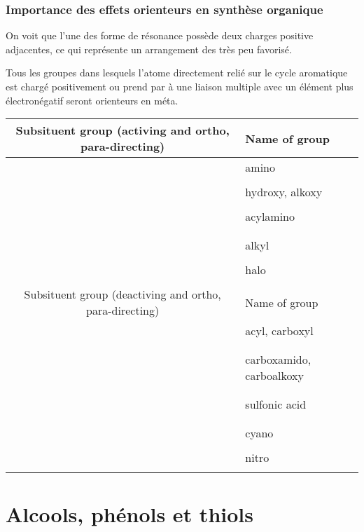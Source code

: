 \section{Importance des effets orienteurs en synthèse organique}
On voit que l'une des forme de résonance possède deux charges positive adjacentes, ce qui représente un arrangement des très peu favorisé.

Tous les groupes dans lesquels l'atome directement relié sur le cycle aromatique est chargé positivement ou prend par à une liaison multiple avec un élément plus électronégatif seront orienteurs en méta.
\\

\begin{tabular}{|c|l|}
  \hline
  Subsituent group (activing and ortho, para-directing)  &      Name of group \\
  \hline

  &  amino \\
  & \\
  &  hydroxy, alkoxy \\
  & \\
  & acylamino \\
  &  \\
  & \\
  &  alkyl \\
  & \\
  &  halo \\
  & \\
  \hline

  Subsituent group (deactiving and ortho, para-directing)  &      Name of group \\
  \hline

  &  acyl, carboxyl \\
  & \\
  & \\
  &  carboxamido, carboalkoxy \\
  & \\
  & \\
  & sulfonic acid \\
  &  \\
  & \\
  &  cyano \\
  & \\
  &  nitro \\
  & \\
  \hline
\end{tabular}




\part{Alcools, phénols et thiols}
